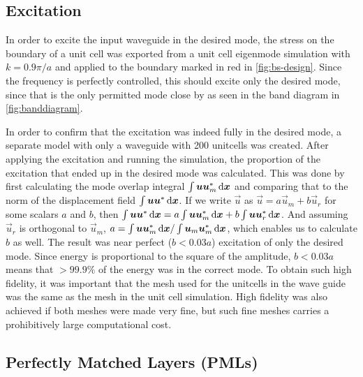 \subsection{Excitation}\label{sec:excitation_method}

In order to excite the input waveguide in the desired mode,
the stress on the boundary of a unit cell was exported from a unit cell
eigenmode simulation with $k=0.9 \pi / a$ and applied to the boundary marked in red in
\cref{fig:bs-design}.
Since the frequency is perfectly controlled, this should excite only the desired
mode, since that is the only permitted mode close by as seen in the band diagram
in \cref{fig:banddiagram}.

In order to confirm that the excitation was indeed fully in the desired mode, a
separate model with only a waveguide with 200 unitcells was created.
After applying the excitation and running the simulation,
the proportion of the excitation that ended up in the desired mode was
calculated.
This was done by first calculating the mode overlap integral
$\int \vec u \vec u_m^* \dl{\vec x}$
and comparing that to the norm of the displacement field
$\int \vec u \vec u^* \dl{\vec x}$.
If we write $\vec u$ as $\vec u = a \vec u_m + b \vec u_r$ for some scalars $a$ and $b$,
then
$\int \vec u \vec u^* \dl{\vec x} = a\int \vec u \vec u_m^*\dl{\vec x} + b\int
\vec u \vec u_r^*\dl{\vec x}$.
And assuming $\vec u_r$ is orthogonal to $\vec u_m$,
$a = \int \vec u \vec u_m^*\dl{\vec x} / \int \vec u_m \vec u_m^*\dl{\vec x}$,
which enables us to calculate $b$ as well.
The result was near perfect ($b < 0.03 a$) excitation of only the desired mode.
Since energy is proportional to
the square of the amplitude, $b < 0.03 a$ means that $>99.9 \%$ of the energy was
in the correct mode.
To obtain such high fidelity, it was important that the mesh used for the
unitcells in the wave guide was the same as the mesh in the unit cell
simulation.
High fidelity was also achieved if both meshes were made very fine, but such
fine meshes carries a prohibitively large computational cost.

\subsection{Perfectly Matched Layers (PMLs)}

